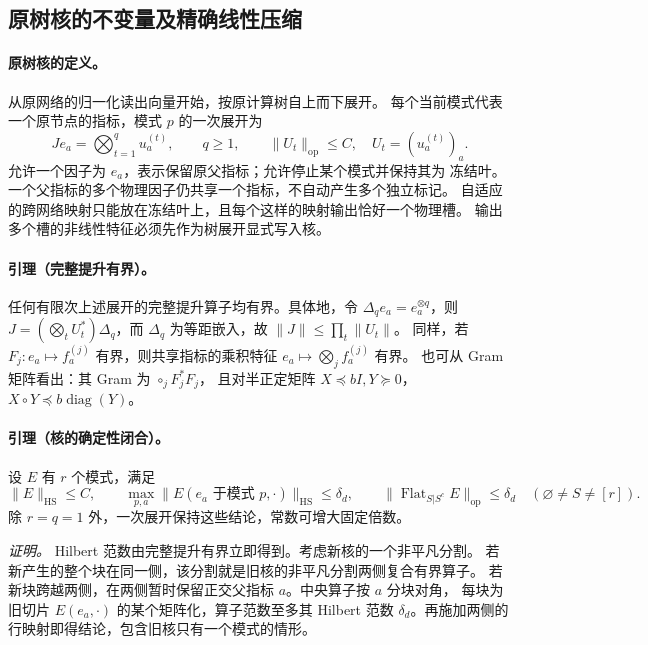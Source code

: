 \documentclass[a4paper]{tufte-handout}
\begin{document}
\begin{fullwidth}
\subsection{原树核的不变量及精确线性压缩}
\label{fp:core-invariant-section}

\paragraph{原树核的定义。}
从原网络的归一化读出向量开始，按原计算树自上而下展开。
每个当前模式代表一个原节点的指标，模式 $p$ 的一次展开为
\begin{equation}
 J e_a=\bigotimes_{t=1}^{q}u_a^{(t)},\qquad q\geq1,
 \qquad \|U_t\|_{\mathrm{op}}\leq C,
 \quad U_t=(u_a^{(t)})_a .
 \label{fp:core-replacement}
\end{equation}
允许一个因子为 $e_a$，表示保留原父指标；允许停止某个模式并保持其为
冻结叶。一个父指标的多个物理因子仍共享一个指标，不自动产生多个独立标记。
自适应的跨网络映射只能放在冻结叶上，且每个这样的映射输出恰好一个物理槽。
输出多个槽的非线性特征必须先作为树展开显式写入核。

\paragraph{引理（完整提升有界）。}
任何有限次上述展开的完整提升算子均有界。具体地，令
$\Delta_q e_a=e_a^{\otimes q}$，则
$J=(\bigotimes_tU_t^*)\Delta_q$，而 $\Delta_q$ 为等距嵌入，故
$\|J\|\leq\prod_t\|U_t\|$。
同样，若 $F_j:e_a\mapsto f_a^{(j)}$ 有界，则共享指标的乘积特征
$e_a\mapsto\bigotimes_jf_a^{(j)}$ 有界。
也可从 Gram 矩阵看出：其 Gram 为 $\mathop{\circ}_jF_j^*F_j$，
且对半正定矩阵 $X\preceq bI,Y\succeq0$，
$X\circ Y\preceq b\operatorname{diag}(Y)$。

\paragraph{引理（核的确定性闭合）。}
\label{fp:core-closure}
设 $E$ 有 $r$ 个模式，满足
\begin{equation}
 \|E\|_{\mathrm{HS}}\leq C,\qquad
 \max_{p,a}\|E(e_a\text{ 于模式 }p,\cdot)\|_{\mathrm{HS}}\leq\delta_d,
 \qquad
 \|\operatorname{Flat}_{S|S^c}E\|_{\mathrm{op}}\leq\delta_d
 \quad(\varnothing\ne S\ne[r]).
 \label{fp:core-invariants}
\end{equation}
除 $r=q=1$ 外，一次展开保持这些结论，常数可增大固定倍数。

\emph{证明。}
Hilbert 范数由完整提升有界立即得到。考虑新核的一个非平凡分割。
若新产生的整个块在同一侧，该分割就是旧核的非平凡分割两侧复合有界算子。
若新块跨越两侧，在两侧暂时保留正交父指标 $a$。中央算子按 $a$ 分块对角，
每块为旧切片 $E(e_a,\cdot)$ 的某个矩阵化，算子范数至多其 Hilbert 范数
$\delta_d$。再施加两侧的行映射即得结论，包含旧核只有一个模式的情形。


\end{fullwidth}
\end{document}

